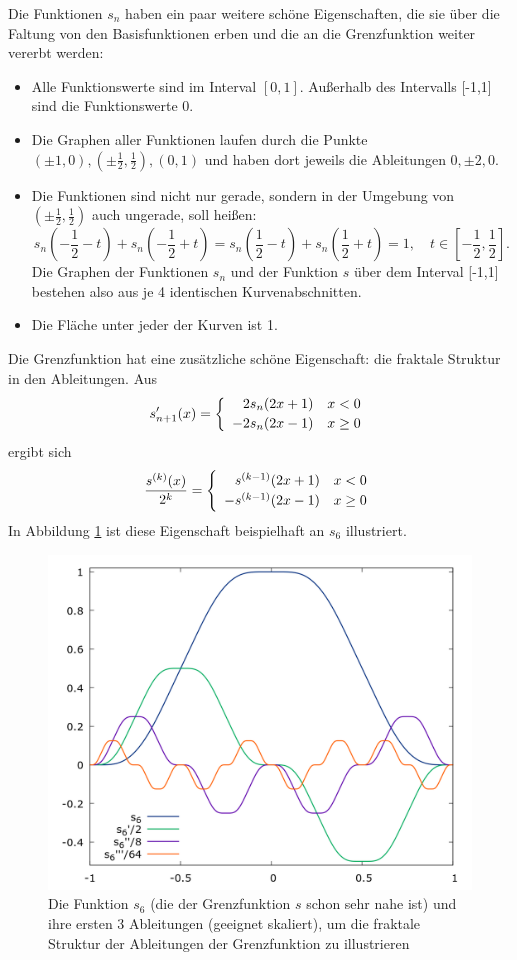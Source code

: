 \documentclass[german]{article}
\begin{document}
Die Funktionen $s_n$ haben ein paar weitere schöne Eigenschaften, die sie über die Faltung von den Basisfunktionen erben 
und die an die Grenzfunktion weiter vererbt werden:
\begin{itemize}
\item Alle Funktionswerte sind im Interval $[0,1]$. Außerhalb des Intervalls [-1,1] sind die Funktionswerte 0.
\item Die Graphen aller Funktionen laufen durch die Punkte $(\pm 1,0), (\pm \frac{1}{2},\frac{1}{2}), (0,1)$ 
      und haben dort jeweils die Ableitungen $0, \pm 2, 0$.
\item Die Funktionen sind nicht nur gerade, sondern in der Umgebung von $(\pm \frac{1}{2},\frac{1}{2})$ auch ungerade, soll heißen:
      \[ s_n(-\frac{1}{2}-t) + s_n(-\frac{1}{2}+t) = s_n(\frac{1}{2}-t) + s_n(\frac{1}{2}+t) = 1, \quad t \in [-\frac{1}{2},\frac{1}{2}]. \] 
	  Die Graphen der Funktionen $s_n$ und der Funktion $s$ über dem Interval [-1,1] bestehen also aus je 4 identischen Kurvenabschnitten.
\item Die Fläche unter jeder der Kurven ist 1.
\end{itemize}

Die Grenzfunktion hat eine zusätzliche schöne Eigenschaft: die fraktale Struktur in den Ableitungen.
Aus
\[s'_{n+1}(x) = \left\{
	\begin{array}{ll}
		\hphantom{-}2s_n(2x+1) & x<0 \\[2pt]
		          - 2s_n(2x-1) & x\ge 0
	\end {array}
\right.
\]
ergibt sich
\[\frac{s^{(k)}(x)}{2^k} = \left\{
	\begin{array}{ll}
		\hphantom{-}s^{(k-1)}(2x+1) & x<0 \\[2pt]
		          - s^{(k-1)}(2x-1) & x\ge 0
	\end {array} 
\right.
\]
In Abbildung \ref{fig:der} ist diese Eigenschaft beispielhaft an $s_6$ illustriert.

\begin{figure}
  \includegraphics[width=\linewidth]{SchnablFunction_derivatives.png}
  \caption{Die Funktion $s_6$ (die der Grenzfunktion $s$ schon sehr nahe ist) und ihre ersten 3 Ableitungen (geeignet skaliert), 
  um die fraktale Struktur der Ableitungen der Grenzfunktion zu illustrieren}
  \label{fig:der}
\end{figure}
\end{document}
